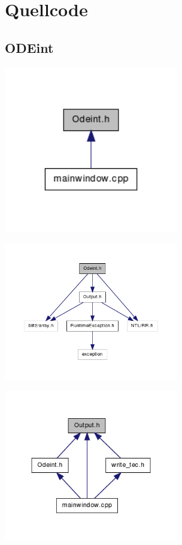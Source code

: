 \chapter{Quellcode}
\label{ch:6}
\section{ODEint}
\includegraphics[width=3in]{figures/_odeint_8h__dep__incl.png}

\includegraphics[width=3in]{figures/_odeint_8h__incl.png}

\includegraphics[width=3in]{figures/_output_8h__dep__incl.png}

